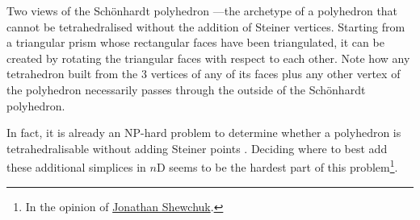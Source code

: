 {
\caption[The Sch\"onhardt polyhedron]{Two views of the Sch\"onhardt polyhedron \citep{Schonhardt28}---the archetype of a polyhedron that cannot be tetrahedralised without the addition of Steiner vertices.
Starting from a triangular prism whose rectangular faces have been triangulated, it can be created by rotating the triangular faces with respect to each other.
Note how any tetrahedron built from the 3 vertices of any of its faces plus any other vertex of the polyhedron necessarily passes through the outside of the Sch\"onhardt polyhedron.}
\label{fig:schoenhardt}
}
In fact, it is already an NP-hard problem to determine whether a polyhedron is tetrahedralisable without adding Steiner points \citep{Ruppert92}.
Deciding where to best add these additional simplices in $n$D seems to be the hardest part of this problem\footnote{In the opinion of \href{http://www.cs.berkeley.edu/~jrs/}{Jonathan Shewchuk}.}.

